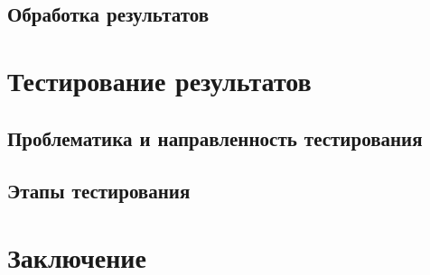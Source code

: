 \documentclass[14pt]{spbau-diploma}
\begin{document}
\subsection{Обработка результатов}

\section{Тестирование результатов}  
\subsection{Проблематика и направленность тестирования}
\subsection{Этапы тестирования}


\section*{Заключение}




\end{document}
